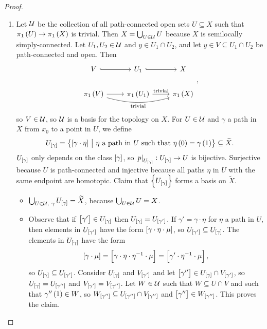 \begin{proof}
\begin{enumerate}
\item Let $ \mathcal{U} $ be the collection of all path-connected open sets $ U \subseteq X $ such that $ \pi_1\br{U} \to \pi_1\br{X} $ is trivial. Then $ X = \bigcup_{U \in \mathcal{U}} U $ because $ X $ is semilocally simply-connected. Let $ U_1, U_2 \in \mathcal{U} $ and $ y \in U_1 \cap U_2 $, and let $ y \in V \subseteq U_1 \cap U_2 $ be path-connected and open. Then
$$
\begin{tikzcd}
V \arrow[hookrightarrow]{r} & U_1 \arrow[hookrightarrow]{r} & X \\
\pi_1\br{V} \arrow{r} \arrow[bend right=15]{rr}[swap]{\text{trivial}} & \pi_1\br{U_1} \arrow{r}{\text{trivial}} & \pi_1\br{X}
\end{tikzcd},
$$
so $ V \in \mathcal{U} $, so $ \mathcal{U} $ is a basis for the topology on $ X $. For $ U \in \mathcal{U} $ and $ \gamma $ a path in $ X $ from $ x_0 $ to a point in $ U $, we define
$$ U_{\sbr{\gamma}} = \cbr{\sbr{\gamma \cdot \eta} \st \eta \ \text{a path in} \ U \ \text{such that} \ \eta\br{0} = \gamma\br{1}} \subseteq \widetilde{X}. $$
$ U_{\sbr{\gamma}} $ only depends on the class $ \sbr{\gamma} $, so $ \eval{p}_{U_{\sbr{\gamma}}} : U_{\sbr{\gamma}} \to U $ is bijective. Surjective because $ U $ is path-connected and injective because all paths $ \eta $ in $ U $ with the same endpoint are homotopic. Claim that $ \cbr{U_{\sbr{\gamma}}} $ forms a basis on $ \widetilde{X} $.
\begin{itemize}
\item $ \bigcup_{U \in \UUU, \ \gamma} U_{\sbr{\gamma}} = \widetilde{X} $, because $ \bigcup_{U \in \mathcal{U}} U = X $.
\item Observe that if $ \sbr{\gamma'} \in U_{\sbr{\gamma}} $ then $ U_{\sbr{\gamma}} = U_{\sbr{\gamma'}} $. If $ \gamma' = \gamma \cdot \eta $ for $ \eta $ a path in $ U $, then elements in $ U_{\sbr{\gamma'}} $ have the form $ \sbr{\gamma \cdot \eta \cdot \mu} $, so $ U_{\sbr{\gamma'}} \subseteq U_{\sbr{\gamma}} $. The elements in $ U_{\sbr{\gamma}} $ have the form
$$ \sbr{\gamma \cdot \mu} = \sbr{\gamma \cdot \eta \cdot \eta^{-1} \cdot \mu} = \sbr{\gamma' \cdot \eta^{-1} \cdot \mu}, $$
so $ U_{\sbr{\gamma}} \subseteq U_{\sbr{\gamma'}} $. Consider $ U_{\sbr{\gamma}} $ and $ V_{\sbr{\gamma'}} $ and let $ \sbr{\gamma''} \in U_{\sbr{\gamma}} \cap V_{\sbr{\gamma'}} $, so $ U_{\sbr{\gamma}} = U_{\sbr{\gamma''}} $ and $ V_{\sbr{\gamma'}} = V_{\sbr{\gamma''}} $. Let $ W \in \mathcal{U} $ such that $ W \subseteq U \cap V $ and such that $ \gamma''\br{1} \in W $, so $ W_{\sbr{\gamma''}} \subseteq U_{\sbr{\gamma''}} \cap V_{\sbr{\gamma''}} $ and $ \sbr{\gamma''} \in W_{\sbr{\gamma''}} $. This proves the claim.

\end{itemize}
\end{enumerate}
\end{proof}
